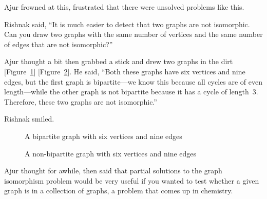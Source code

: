 Ajur frowned at this, frustrated that there were unsolved problems like this.

Rishnak said, ``It is much easier to detect that two graphs are not isomorphic. Can you draw two graphs with the same number of vertices and the same number of edges that are not isomorphic?''

Ajur thought a bit then grabbed a stick and drew two graphs in the dirt [Figure~\ref{8g3}] [Figure~\ref{8g4}]. He said, ``Both these graphs have six vertices and nine edges, but the first graph is bipartite---we know this because all cycles are of even length---while the other graph is not bipartite because it has a cycle of length~3. Therefore, these two graphs are not isomorphic.''

Rishnak smiled.

\begin{figure}
\begin{center}
\caption{A bipartite graph with six vertices and nine edges}\label{8g3}
\end{center}
\end{figure}

\begin{figure}
\begin{center}
\caption{A non-bipartite graph with six vertices and nine edges}\label{8g4}
\end{center}
\end{figure}

Ajur thought for awhile, then said that partial solutions to the graph isomorphism problem would be very useful if you wanted to test whether a given graph is in a collection of graphs, a problem that comes up in chemistry.

